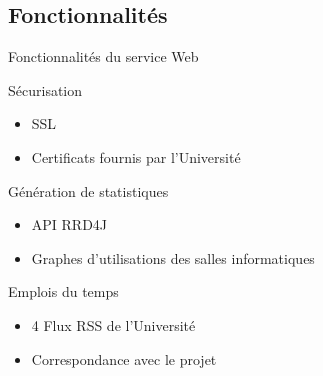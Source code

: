 
\subsection{Fonctionnalit\'es}

\begin{frame}{Fonctionnalit\'es du service Web}
	\begin{block}{S\'ecurisation}
		\begin{itemize}
			\item SSL
			\item Certificats fournis par l'Universit\'e
			
		\end{itemize}

	\end{block}
	
	\begin{block}{G\'en\'eration de statistiques}
		\begin{itemize}
			\item API RRD4J
			\item Graphes d'utilisations des salles informatiques
			
		\end{itemize}

	\end{block}
	
	\begin{block}{Emplois du temps}
		\begin{itemize}
			\item 4 Flux RSS de l'Universit\'e
			\item Correspondance avec le projet
			
		\end{itemize}

	\end{block}
	
\end{frame}

	
